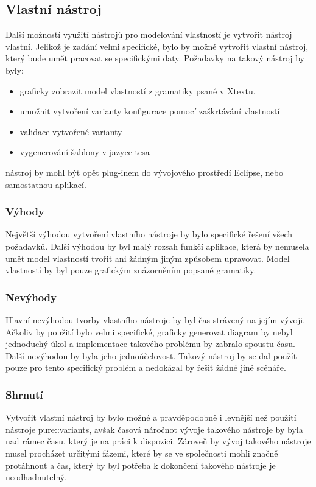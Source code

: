 \subsection{Vlastní nástroj}

Další možností využití nástrojů pro modelování vlastností je vytvořit nástroj vlastní. Jelikož je zadání velmi specifické, bylo by možné vytvořit vlastní nástroj, který bude umět pracovat se specifickými daty. Požadavky na takový nástroj by byly:
\begin{itemize}
	\item graficky zobrazit model vlastností z gramatiky psané v Xtextu.
	\item umožnit vytvoření varianty konfigurace pomocí zaškrtávání vlastností
	\item validace vytvořené varianty
	\item vygenerování šablony v jazyce tesa
\end{itemize}
nástroj by mohl být opět plug-inem do vývojového prostředí Eclipse, nebo samostatnou aplikací. 

\subsubsection{Výhody}
Největší výhodou vytvoření vlastního nástroje by bylo specifické řešení všech požadavků. Další výhodou by byl malý rozsah funkčí aplikace, která by nemusela umět model vlastností tvořit ani žádným jiným způsobem upravovat. Model vlastností by byl pouze grafickým znázorněním popsané gramatiky. 

\subsubsection{Nevýhody}
Hlavní nevýhodou tvorby vlastního nástroje by byl čas strávený na jejím vývoji. Ačkoliv by použití bylo velmi specifické, graficky generovat diagram by nebyl jednoduchý úkol a implementace takového problému by zabralo spoustu času. Další nevýhodou by byla jeho jednoúčelovost. Takový nástroj by se dal použít pouze pro tento specifický problém a nedokázal by řešit žádné jiné scénáře.

\subsubsection{Shrnutí}
Vytvořit vlastní nástroj by bylo možné a pravděpodobně i levnější než použití nástroje pure::variants, avšak časová náročnot vývoje takového nástroje by byla nad rámec času, který je na práci k dispozici. Zároveň by vývoj takového nástroje musel procházet určitými fázemi, které by se ve společnosti mohli značně protáhnout a čas, který by byl potřeba k dokončení takového nástroje je neodhadnutelný.




















